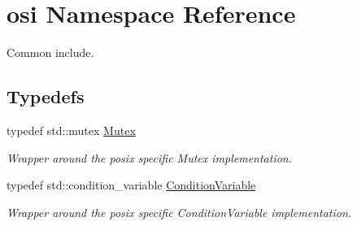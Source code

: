 \hypertarget{namespaceosi}{}\section{osi Namespace Reference}
\label{namespaceosi}


Common include.  


\subsection*{Typedefs}
\begin{DoxyCompactItemize}
\item 
typedef std\+::mutex \hyperlink{namespaceosi_ac3d484da0f89f06e329d4b84d7459d9b}{Mutex}\hypertarget{namespaceosi_ac3d484da0f89f06e329d4b84d7459d9b}{}\label{namespaceosi_ac3d484da0f89f06e329d4b84d7459d9b}

\begin{DoxyCompactList}\small\item\em Wrapper around the posix specific Mutex implementation. \end{DoxyCompactList}\item 
typedef std\+::condition\+\_\+variable \hyperlink{namespaceosi_a31b1ce104b168554e4832b5d3b684073}{Condition\+Variable}\hypertarget{namespaceosi_a31b1ce104b168554e4832b5d3b684073}{}\label{namespaceosi_a31b1ce104b168554e4832b5d3b684073}

\begin{DoxyCompactList}\small\item\em Wrapper around the posix specific Condition\+Variable implementation. \end{DoxyCompactList}\end{DoxyCompactItemize}
